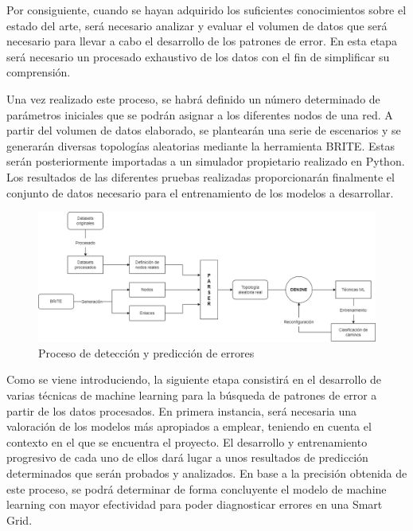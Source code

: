 Por consiguiente, cuando se hayan adquirido los suficientes conocimientos sobre el estado del arte, será necesario analizar y evaluar el volumen de datos que será necesario para llevar a cabo el desarrollo de los patrones de error. En esta etapa será necesario un procesado exhaustivo de los datos con el fin de simplificar su comprensión.

\vspace{0.3cm}

Una vez realizado este proceso, se habrá definido un número determinado de parámetros iniciales que se podrán asignar a los diferentes nodos de una red. A partir del volumen de datos elaborado, se plantearán una serie de escenarios y se generarán diversas topologías aleatorias mediante la herramienta BRITE. Estas serán posteriormente importadas a un simulador propietario realizado en Python. Los resultados de las diferentes pruebas realizadas proporcionarán finalmente el conjunto de datos necesario para el entrenamiento de los modelos a desarrollar.

\vspace{0.5cm}

\begin{figure}[!htb]
  \centering
  \includegraphics[width=1\textwidth]{img/imagen.drawio.png}
  \caption{Proceso de detección y predicción de errores}
  \label{fig:1}
\end{figure}

\vspace{0.3cm}

Como se viene introduciendo, la siguiente etapa consistirá en el desarrollo de varias técnicas de machine learning para la búsqueda de patrones de error a partir de los datos procesados. En primera instancia, será necesaria una valoración de los modelos más apropiados a emplear, teniendo en cuenta el contexto en el que se encuentra el proyecto. El desarrollo y entrenamiento progresivo de cada uno de ellos dará lugar a unos resultados de predicción determinados que serán probados y analizados. En base a la precisión obtenida de este proceso, se podrá determinar de forma concluyente el modelo de machine learning con mayor efectividad para poder diagnosticar errores en una Smart Grid. 

